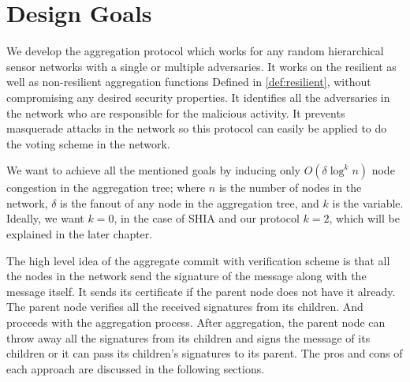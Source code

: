 
\section{Design Goals}	
	We develop the aggregation protocol which works for any random hierarchical sensor networks with a single or multiple adversaries.
	It works on the resilient as well as non-resilient aggregation functions Defined in \ref{def:resilient}, without compromising any desired security properties.
	It identifies all the adversaries in the network who are responsible for the malicious activity.
	It prevents masquerade attacks in the network so this protocol can easily be applied to do the voting scheme in the network.

	We want to achieve all the mentioned goals by inducing only $O(\delta \log^{k} n)$ node congestion in the aggregation tree; where $n$ is the number of nodes in the network, $\delta$ is the fanout of any node in the aggregation tree, and $k$ is the variable.
	Ideally, we want $k=0$, in the case of SHIA and our protocol $k=2$, which will be explained in the later chapter.

	The high level idea of the aggregate commit with verification scheme is that all the nodes in the network send the signature of the message along with the message itself. 
	It sends its certificate if the parent node does not have it already.
	The parent node verifies all the received signatures from its children.
	And proceeds with the aggregation process.
	After aggregation, the parent node can throw away all the signatures from its children and signs the message of its children or it can pass its children's signatures to its parent. 
	The pros and cons of each approach are discussed in the following sections. 

